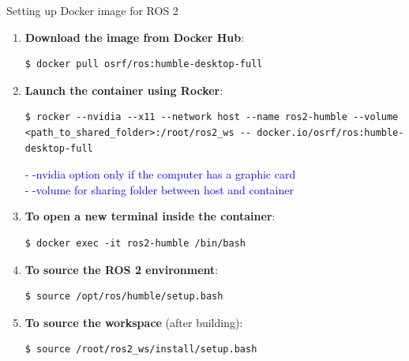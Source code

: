 \begin{frame}{Setting up Docker image for ROS 2}
    \begin{enumerate}
        \item \textbf{Download the image from Docker Hub}:
              \begin{lstlisting}[language=shell]
$ docker pull osrf/ros:humble-desktop-full
\end{lstlisting}

        \item \textbf{Launch the container using Rocker}:
              \begin{lstlisting}[language=shell]
$ rocker --nvidia --x11 --network host --name ros2-humble --volume <path_to_shared_folder>:/root/ros2_ws -- docker.io/osrf/ros:humble-desktop-full
\end{lstlisting}
              \textcolor{blue}{- -nvidia option only if the computer has a graphic card}\\
              \textcolor{blue}{- -volume for sharing folder between host and container}

        \item \textbf{To open a new terminal inside the container}:
              \begin{lstlisting}[language=shell]
$ docker exec -it ros2-humble /bin/bash 
\end{lstlisting}

              \framebreak

        \item \textbf{To source the ROS 2 environment}:
              \begin{lstlisting}[language=shell]
$ source /opt/ros/humble/setup.bash
\end{lstlisting}

        \item \textbf{To source the workspace} (after building):
              \begin{lstlisting}[language=shell]
$ source /root/ros2_ws/install/setup.bash
\end{lstlisting}
    \end{enumerate}
\end{frame}


